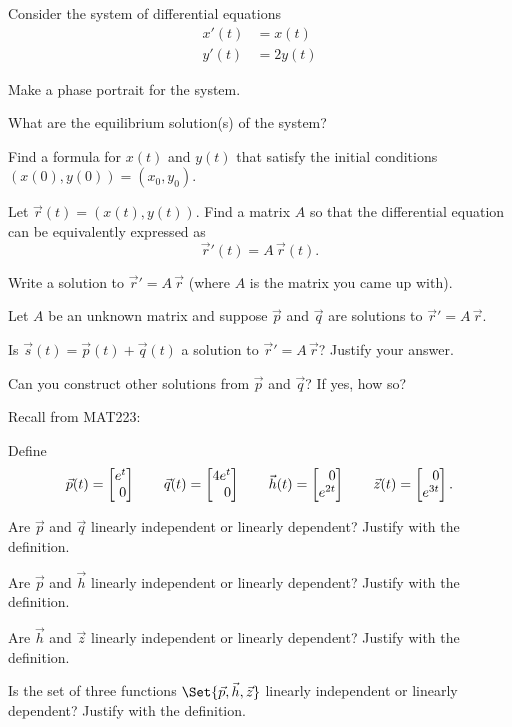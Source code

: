 \documentclass{workbook}
\begin{document}
%
%

\begin{slide}
	\question
	Consider the system of differential equations
	\begin{align*}
		x'(t) &= x(t)\\
		y'(t) &= 2y(t)
	\end{align*}

	\begin{parts}
		\item Make a phase portrait for the system.
		\item What are the equilibrium solution(s) of the system?
		\item 
		Find a formula for $x(t)$ and $y(t)$ that satisfy the initial conditions $(x(0), y(0))=(x_0, y_0)$.
		\item Let $\vec r(t)=(x(t),y(t))$. Find a matrix $A$ so that the differential equation can be equivalently expressed
		as
		\[
			\vec r'(t) = A\,\vec r(t).
		\]
		\item Write a solution to $\vec r' = A\,\vec r$ (where $A$ is the matrix you came up with).
	\end{parts}
\end{slide}


\begin{slide}
	\question
	Let $A$ be an unknown matrix and suppose $\vec p$ and $\vec q$ are solutions to $\vec r'=A\,\vec r$.

	\begin{parts}
		\item Is $\vec s(t)=\vec p(t)+\vec q(t)$ a solution to $\vec r'=A\,\vec r$? Justify your answer.
		\item Can you construct other solutions from $\vec p$ and $\vec q$? If yes, how so?
	\end{parts}
\end{slide}

\begin{slide}
	\question
	Recall from MAT223:

	Define
	\[
		\vec p(t) = \mat{e^t\\0}\qquad
		\vec q(t) = \mat{4e^t\\0}\qquad
		\vec h(t) = \mat{0\\ e^{2t}}\qquad
		\vec z(t) = \mat{0\\ e^{3t}}.
	\]


	\begin{parts}
		\item Are $\vec p$ and $\vec q$ linearly independent or linearly dependent? Justify with the definition.
		\item Are $\vec p$ and $\vec h$ linearly independent or linearly dependent? Justify with the definition.
		\item Are $\vec h$ and $\vec z$ linearly independent or linearly dependent? Justify with the definition.
		\item Is the set of three functions  $\Set{\vec p,\vec h,\vec z}$ linearly independent or linearly dependent? Justify with the definition.
	\end{parts}
\end{slide}
\end{document}
